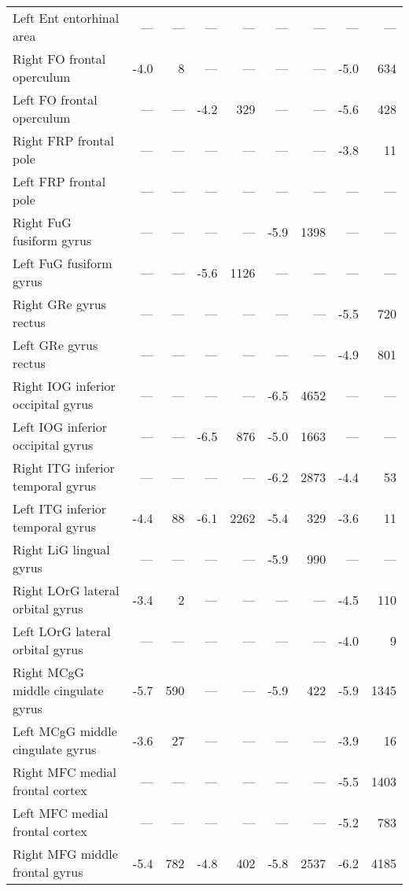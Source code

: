 \documentclass[]{article}
\begin{document}
\begin{table}[ht]
{\begin{tabular}{lrrrrrrrr}
  Left Ent   entorhinal area & --- & --- & --- & --- & --- & --- & --- & --- \\ 
  Right FO    frontal operculum & -4.0 & 8 & --- & --- & --- & --- & -5.0 & 634 \\ 
  Left FO    frontal operculum & --- & --- & -4.2 & 329 & --- & --- & -5.6 & 428 \\ 
  Right FRP   frontal pole & --- & --- & --- & --- & --- & --- & -3.8 & 11 \\ 
  Left FRP   frontal pole & --- & --- & --- & --- & --- & --- & --- & --- \\ 
  Right FuG   fusiform gyrus & --- & --- & --- & --- & -5.9 & 1398 & --- & --- \\ 
  Left FuG   fusiform gyrus & --- & --- & -5.6 & 1126 & --- & --- & --- & --- \\ 
  Right GRe   gyrus rectus & --- & --- & --- & --- & --- & --- & -5.5 & 720 \\ 
  Left GRe   gyrus rectus & --- & --- & --- & --- & --- & --- & -4.9 & 801 \\ 
  Right IOG   inferior occipital gyrus & --- & --- & --- & --- & -6.5 & 4652 & --- & --- \\ 
  Left IOG   inferior occipital gyrus & --- & --- & -6.5 & 876 & -5.0 & 1663 & --- & --- \\ 
  Right ITG   inferior temporal gyrus & --- & --- & --- & --- & -6.2 & 2873 & -4.4 & 53 \\ 
  Left ITG   inferior temporal gyrus & -4.4 & 88 & -6.1 & 2262 & -5.4 & 329 & -3.6 & 11 \\ 
  Right LiG   lingual gyrus & --- & --- & --- & --- & -5.9 & 990 & --- & --- \\ 
  Right LOrG  lateral orbital gyrus & -3.4 & 2 & --- & --- & --- & --- & -4.5 & 110 \\ 
  Left LOrG  lateral orbital gyrus & --- & --- & --- & --- & --- & --- & -4.0 & 9 \\ 
  Right MCgG  middle cingulate gyrus & -5.7 & 590 & --- & --- & -5.9 & 422 & -5.9 & 1345 \\ 
  Left MCgG  middle cingulate gyrus & -3.6 & 27 & --- & --- & --- & --- & -3.9 & 16 \\ 
  Right MFC   medial frontal cortex & --- & --- & --- & --- & --- & --- & -5.5 & 1403 \\ 
  Left MFC   medial frontal cortex & --- & --- & --- & --- & --- & --- & -5.2 & 783 \\ 
  Right MFG   middle frontal gyrus & -5.4 & 782 & -4.8 & 402 & -5.8 & 2537 & -6.2 & 4185 \\ 

\end{tabular}}
\end{table}
\end{document}
